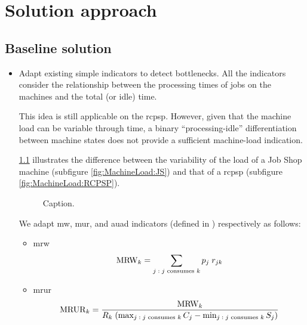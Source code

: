 \chapter{Solution approach} \label{chap:solution-apporach}

\section{Baseline solution} \label{sec:solution-apporach/baseline-solution}

\begin{itemize}
    \item Adapt existing simple indicators to detect bottlenecks.
        All the indicators consider the relationship between the processing times of jobs on the machines
        and the total (or idle) time.
        
        This idea is still applicable on the \ac{rcpsp}. However, given that the machine load can be variable
        through time, a binary \enquote{processing-idle} differentiation between machine states does not
        provide a sufficient machine-load indication.

        \cref{fig:MachineLoad} illustrates the difference between the variability of the load
        of a Job Shop machine (subfigure \ref{fig:MachineLoad:JS}) and that of a \ac{rcpsp}
        (subfigure \ref{fig:MachineLoad:RCPSP}).

    \begin{figure}[t]
      \centering


      \caption{Caption.}
      \label{fig:MachineLoad}
    \end{figure}

    We adapt \ac{mw}, \ac{mur}, and \ac{auad} indicators (defined in ) respectively as follows:
    \begin{itemize}
        \item \ac{mrw}
        $$
        \operatorname{MRW}_{k} = \sum_{\substack{j \;:\; \text{$j$ consumes $k$}}} p_j \; r_{jk}
        $$

        \item \ac{mrur}
        $$
        \operatorname{MRUR}_{k} = \frac{\operatorname{MRW}_{k}}{R_k \; (\max_{j \;:\; \text{$j$ consumes $k$}} C_j - \min_{j \;:\; \text{$j$ consumes $k$}} S_j)}
        $$


\end{itemize}
\end{itemize}
